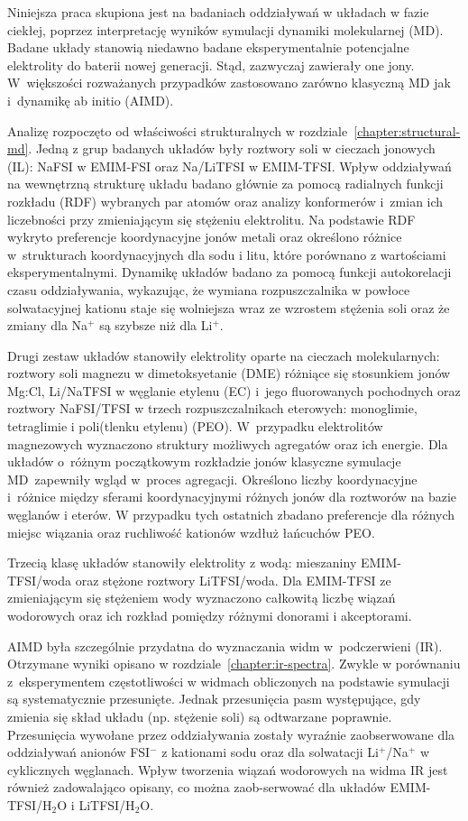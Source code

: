 
Niniejsza praca skupiona jest na badaniach oddziaływań w układach w fazie ciekłej, poprzez interpretację wyników symulacji dynamiki molekularnej (MD). Badane układy stanowią niedawno badane eksperymentalnie potencjalne elektrolity do baterii nowej generacji. Stąd, zazwyczaj zawierały one jony. W~większości rozważanych przypadków zastosowano zarówno klasyczną MD jak i~dynamikę ab initio (AIMD).

Analizę rozpoczęto od właściwości strukturalnych w rozdziale~\ref{chapter:structural-md}. Jedną z grup badanych układów były roztwory soli w cieczach jonowych (IL): NaFSI w EMIM-FSI oraz Na/LiTFSI w EMIM-TFSI. Wpływ oddziaływań na wewnętrzną strukturę układu badano głównie za pomocą radialnych funkcji rozkładu (RDF) wybranych par atomów oraz analizy konformerów i~zmian ich liczebności przy zmieniającym się stężeniu elektrolitu. Na podstawie RDF wykryto preferencje koordynacyjne jonów metali oraz określono różnice w~strukturach koordynacyjnych dla sodu i litu, które porównano z wartościami eksperymentalnymi. Dynamikę układów badano za pomocą funkcji autokorelacji czasu oddziaływania, wykazując, że wymiana rozpuszczalnika w powłoce solwatacyjnej kationu staje się wolniejsza wraz ze wzrostem stężenia soli oraz że zmiany dla Na$^{+}$ są szybsze niż dla Li$^{+}$.

Drugi zestaw układów stanowiły elektrolity oparte na cieczach molekularnych: roztwory soli magnezu w dimetoksyetanie (DME) różniące się stosunkiem jonów Mg:Cl, Li/NaTFSI w węglanie etylenu (EC) i~jego fluorowanych pochodnych oraz roztwory NaFSI/TFSI w trzech rozpuszczalnikach eterowych: monoglimie, tetraglimie i poli(tlenku etylenu) (PEO). W~przypadku elektrolitów magnezowych wyznaczono struktury możliwych agregatów oraz ich energie. Dla układów o~różnym początkowym rozkładzie jonów klasyczne symulacje MD~zapewniły wgląd w~proces agregacji. Określono liczby koordynacyjne i~różnice między sferami koordynacyjnymi różnych jonów dla roztworów na bazie węglanów i eterów. W przypadku tych ostatnich zbadano preferencje dla różnych miejsc wiązania oraz ruchliwość kationów wzdłuż łańcuchów PEO.

Trzecią klasę układów stanowiły elektrolity z wodą: mieszaniny EMIM-TFSI/woda oraz stężone roztwory LiTFSI/woda. Dla EMIM-TFSI ze zmieniającym się stężeniem wody wyznaczono całkowitą liczbę wiązań wodorowych oraz ich rozkład pomiędzy różnymi donorami i akceptorami.

AIMD była szczególnie przydatna do wyznaczania widm w~podczerwieni (IR). Otrzymane wyniki opisano w rozdziale~\ref{chapter:ir-spectra}. Zwykle w porównaniu z~eksperymentem częstotliwości w widmach obliczonych na podstawie symulacji są systematycznie przesunięte. Jednak przesunięcia pasm występujące, gdy zmienia się skład układu (np. stężenie soli) są odtwarzane poprawnie. Przesunięcia wywołane przez oddziaływania zostały wyraźnie zaobserwowane dla oddziaływań anionów FSI$^{-}$ z kationami sodu oraz dla solwatacji Li$^{+}$/Na$^{+}$ w cyklicznych węglanach. Wpływ tworzenia wiązań wodorowych na widma IR jest również zadowalająco opisany, co można zaob-serwować dla układów EMIM-TFSI/H$_2$O i LiTFSI/H$_2$O.

